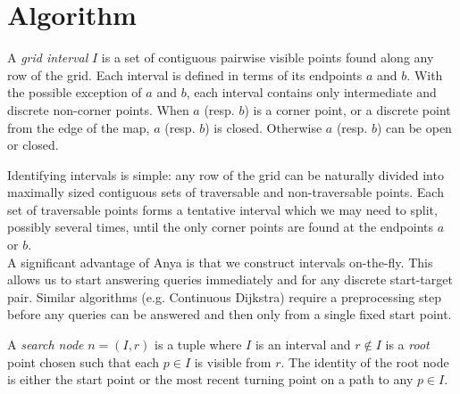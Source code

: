 \section{Algorithm}

\begin{defi}
\label{defi::interval}
A \emph{grid interval} $I$ is a set of contiguous pairwise visible points found
along any row of the grid.  Each interval is defined in terms 
of its endpoints $a$ and $b$. 
With the possible exception of $a$ and $b$, each interval
contains only intermediate and discrete non-corner points.
When $a$ (resp. $b$) is a corner point, or a discrete point from the edge of the map, 
$a$ (resp. $b$) is closed. Otherwise $a$ (resp. $b$) can be open or closed.
\end{defi}
Identifying intervals is simple: any row of the grid can be naturally divided
into maximally sized contiguous sets of traversable and non-traversable points.
Each set of traversable points forms a tentative interval which we may need to
split, possibly several times, until the only corner points are found at the
endpoints $a$ or $b$.
\\
A significant advantage of Anya is that we construct intervals on-the-fly.
This allows us to start answering queries immediately and for any discrete
start-target pair. Similar algorithms (e.g. Continuous Dijkstra) require
a preprocessing step before any queries can be answered and then only
from a single fixed start point. 
\begin{defi}
A \emph{search node} $n = (I, r)$ is a tuple where $I$ is an interval and 
$r \not \in I$ is a \emph{root} point chosen such that each $p \in I$  
is visible from $r$. 
The identity of the root node is either the start point or the most recent
turning point on a path to any $p \in I$.
\end{defi}
